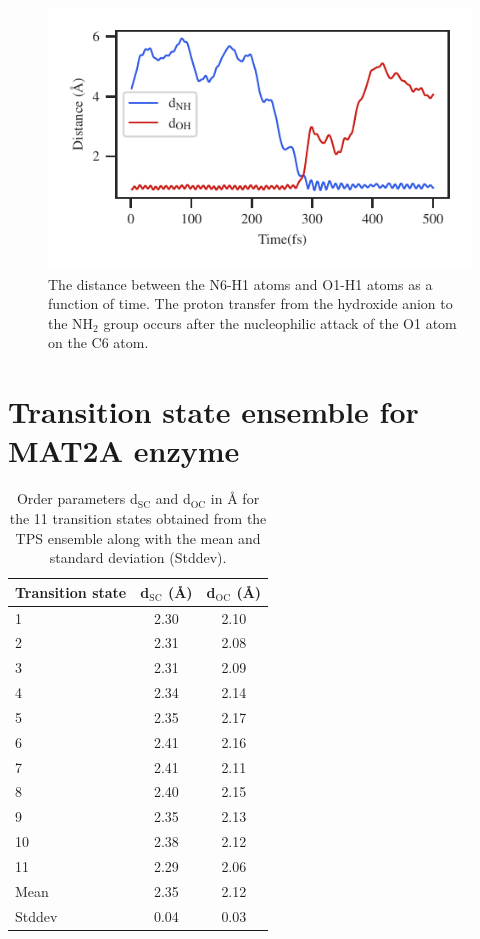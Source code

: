 \documentclass[journal=jpcbfk,manuscript=suppinfo,layout=traditional]{achemso}
\begin{document}
\begin{figure}
\includegraphics[scale=1]{figures/ada-oh-nh60.pdf}
\caption{The distance between the N6-H1 atoms and O1-H1 atoms as a function of time. The proton transfer from the hydroxide
anion to the NH$_2$ group occurs after the nucleophilic attack of the O1 atom on the C6 atom.}
\end{figure}



\section{Transition state ensemble for MAT2A enzyme}
\begin{table}[ht!]
\caption{Order parameters d$_{\text{SC}}$ and d$_{\text{OC}}$ in {\AA} for the 11 transition states obtained from 
the TPS ensemble along with the mean and standard deviation (Stddev).}
\centering
\begin{tabular}{l c c}
\hline\hline
Transition state & d$_{\text{SC}}$ ({\AA}) & d$_{\text{OC}}$ ({\AA})\\
\hline
1 & 2.30 & 2.10 \\
2 & 2.31 & 2.08 \\
3 & 2.31 & 2.09 \\
4 & 2.34 & 2.14 \\
5 & 2.35 & 2.17 \\
6 & 2.41 & 2.16 \\
7 & 2.41 & 2.11 \\
8 & 2.40 & 2.15 \\
9 & 2.35 & 2.13 \\
10& 2.38 & 2.12 \\
11& 2.29 & 2.06 \\
\hline
Mean & 2.35 & 2.12 \\
Stddev & 0.04 & 0.03 \\
\hline\hline
\end{tabular}
%
\end{table}
\end{document}
